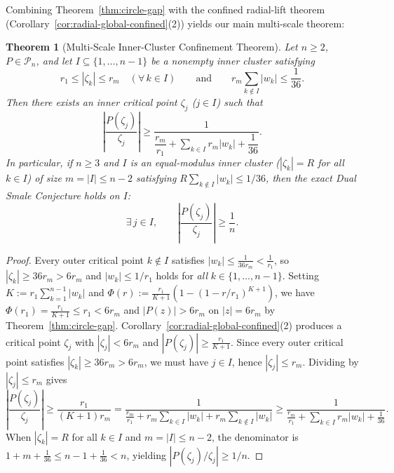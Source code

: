 \documentclass[11pt,a4paper]{article}
\newtheorem{theorem}{Theorem}[section]
\theoremstyle{definition}
\theoremstyle{remark}
\begin{document}
Combining Theorem~\ref{thm:circle-gap} with the confined radial-lift theorem (Corollary~\ref{cor:radial-global-confined}(2)) yields our main multi-scale theorem:

\begin{theorem}[Multi-Scale Inner-Cluster Confinement Theorem]
\label{thm:multiscale}
Let $n \ge 2$, $P \in \mathcal{P}_n$, and let $I \subseteq \{1, \dots, n - 1\}$ be a nonempty inner cluster satisfying
\[
r_1 \le |\zeta_k| \le r_m \quad (\forall\, k \in I) \qquad \text{and} \qquad r_m \sum_{k \notin I} |w_k| \le \frac{1}{36}.
\]
Then there exists an \emph{inner} critical point $\zeta_j$ ($j \in I$) such that
\begin{equation}
\label{eq:multiscale-bound}
\left|\frac{P(\zeta_j)}{\zeta_j}\right| \ge \frac{1}{\dfrac{r_m}{r_1} + \sum_{k \in I} r_m |w_k| + \dfrac{1}{36}}.
\end{equation}
In particular, if $n \ge 3$ and $I$ is an equal-modulus inner cluster ($|\zeta_k| = R$ for all $k \in I$) of size $m = |I| \le n - 2$ satisfying $R \sum_{k \notin I} |w_k| \le 1/36$, then the \emph{exact} Dual Smale Conjecture holds on $I$:
\[
\exists\, j \in I, \qquad \left|\frac{P(\zeta_j)}{\zeta_j}\right| \ge \frac{1}{n}.
\]
\end{theorem}

\begin{proof}
Every outer critical point $k \notin I$ satisfies $|w_k| \le \frac{1}{36 r_m} < \frac{1}{r_1}$, so $|\zeta_k| \ge 36 r_m > 6 r_m$ and $|w_k| \le 1/r_1$ holds for \emph{all} $k \in \{1, \dots, n - 1\}$. Setting $K := r_1 \sum_{k=1}^{n-1} |w_k|$ and $\Phi(r) := \frac{r_1}{K + 1}(1 - (1 - r/r_1)^{K+1})$, we have $\Phi(r_1) = \frac{r_1}{K + 1} \le r_1 < 6 r_m$ and $|P(z)| > 6 r_m$ on $|z| = 6 r_m$ by Theorem~\ref{thm:circle-gap}. Corollary~\ref{cor:radial-global-confined}(2) produces a critical point $\zeta_j$ with $|\zeta_j| < 6 r_m$ and $|P(\zeta_j)| \ge \frac{r_1}{K + 1}$. Since every outer critical point satisfies $|\zeta_k| \ge 36 r_m > 6 r_m$, we must have $j \in I$, hence $|\zeta_j| \le r_m$. Dividing by $|\zeta_j| \le r_m$ gives
\[
\left|\frac{P(\zeta_j)}{\zeta_j}\right| \ge \frac{r_1}{(K + 1) r_m} = \frac{1}{\frac{r_m}{r_1} + r_m \sum_{k \in I} |w_k| + r_m \sum_{k \notin I} |w_k|} \ge \frac{1}{\frac{r_m}{r_1} + \sum_{k \in I} r_m |w_k| + \frac{1}{36}}.
\]
When $|\zeta_k| = R$ for all $k \in I$ and $m = |I| \le n - 2$, the denominator is $1 + m + \frac{1}{36} \le n - 1 + \frac{1}{36} < n$, yielding $|P(\zeta_j)/\zeta_j| \ge 1/n$.
\end{proof}
\end{document}
